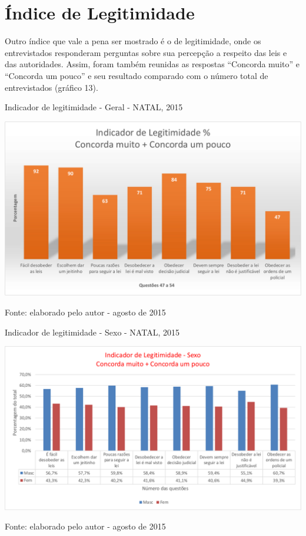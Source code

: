 \documentclass[
	12pt,				%
	openright,			%
	twoside,			%
	a4paper,			%
	chapter=TITLE,		%
	section=TITLE,		%
	subsection=TITLE,	%
	subsubsection=TITLE,%
	spanish,            %
	english,			%
	brazil				%
	]{abntex2}
\begin{document}
\section{Índice de Legitimidade}
Outro índice que vale a pena ser mostrado é o de legitimidade, onde os entrevistados responderam perguntas sobre sua percepção a respeito das leis e das autoridades. Assim, foram também reunidas as respostas “Concorda muito” e “Concorda um pouco” e seu resultado comparado com o número total de entrevistados (gráfico 13).
\begin{grafico}[!htpb]
	\caption{Indicador de legitimidade - Geral - NATAL, 2015}
	\begin{center}
		\includegraphics[scale=0.55]{Legitimidade_geral.png}
	\end{center}
	\ABNTEXchapterfont\small{Fonte: elaborado pelo autor - agosto de 2015}
	\label{Leg_geral}
\end{grafico}
\begin{grafico}[!htpb]
	\caption{Indicador de legitimidade - Sexo - NATAL, 2015}
	\begin{center}
		\includegraphics[scale=0.5]{Legitimidade-sexo.png}
	\end{center}
	\ABNTEXchapterfont\small{Fonte: elaborado pelo autor - agosto de 2015}
	\label{Leg_sexo}
\end{grafico}
\end{document}
